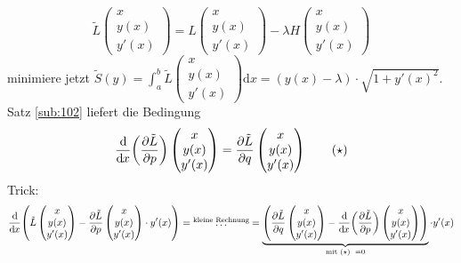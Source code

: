 \[
	\tilde L \begin{pmatrix}
		x \\ y(x) \\ y'(x)
	\end{pmatrix} = L \begin{pmatrix}
		x \\ y(x) \\ y'(x)
	\end{pmatrix} - \lambda  H \begin{pmatrix}
		x \\ y(x) \\ y'(x)
	\end{pmatrix}
\]
minimiere jetzt $\tilde S (y) = \int_{a} ^{b} \! \tilde L \begin{pmatrix}
		x \\ y(x) \\ y'(x)
	\end{pmatrix}  \mathrm{d}x  = (y(x) - \lambda ) \cdot  \sqrt{1+ y'(x)^2}  $. Satz \ref{sub:102} liefert die Bedingung 
\[
	\diffd{}{x} \enbrace*{\diff{\tilde L}{p} }  \begin{pmatrix}
		x \\ y(x) \\ y'(x)
	\end{pmatrix} = \diff{\tilde L}{q} \begin{pmatrix}
		x \\ y(x) \\ y'(x)
	\end{pmatrix} \tag{$\star$} 
\]
Trick: 
\[
	 \diffd{}{x} \enbrace*{\tilde L \begin{pmatrix}
		x \\ y(x) \\ y'(x)
	\end{pmatrix} - \diff{\tilde L}{p} \begin{pmatrix}
		x \\ y(x) \\ y'(x)
	\end{pmatrix} \cdot y'(x)} = \overset{\text{kleine Rechnung}}{\ldots } = \underbrace{\enbrace*{\diff{\tilde L}{q} \begin{pmatrix}
		x \\ y(x) \\ y'(x)
	\end{pmatrix} - \diffd{}{x} \enbrace*{\diff{\tilde L}{p} } \begin{pmatrix}
		x \\ y(x) \\ y'(x)
	\end{pmatrix}}}_{\text{mit }(\star) \enspace=0} \cdot y'(x)  
\]
